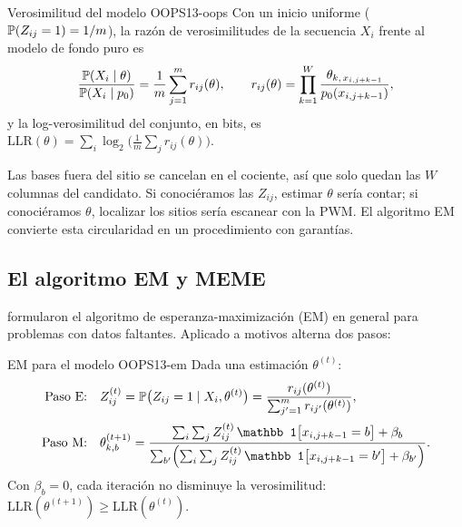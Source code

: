 \begin{definicion}{Verosimilitud del modelo OOPS}{13-oops}
Con un inicio uniforme ($\mathbb{P}(Z_{ij}=1)=1/m$), la razón de verosimilitudes de la secuencia $X_i$ frente al modelo de fondo puro es
\begin{equation}\label{eq:13-oops}
\frac{\mathbb{P}(X_i\mid\theta)}{\mathbb{P}(X_i\mid p_0)} = \frac{1}{m}\sum_{j=1}^{m} r_{ij}(\theta),\qquad
r_{ij}(\theta)=\prod_{k=1}^{W}\frac{\theta_{k,\,x_{i,j+k-1}}}{p_0(x_{i,j+k-1})},
\end{equation}
y la log-verosimilitud del conjunto, en bits, es $\mathrm{LLR}(\theta)=\sum_i\log_2\bigl(\frac1m\sum_j r_{ij}(\theta)\bigr)$.
\end{definicion}

\begin{simbolos}
\end{simbolos}

Las bases fuera del sitio se cancelan en el cociente, así que solo quedan las $W$ columnas del candidato. Si conociéramos las $Z_{ij}$, estimar $\theta$ sería contar; si conociéramos $\theta$, localizar los sitios sería escanear con la PWM. El algoritmo EM convierte esta circularidad en un procedimiento con garantías.

\subsection{El algoritmo EM y MEME}

\textcite{c13-dempster1977} formularon el algoritmo de esperanza-maximización (EM) en general para problemas con datos faltantes. Aplicado a motivos alterna dos pasos:

\begin{teorema}{EM para el modelo OOPS}{13-em}
Dada una estimación $\theta^{(t)}$:
\begin{align}
\text{Paso E:}\quad & Z_{ij}^{(t)} = \Prob\bigl(Z_{ij}=1\mid X_i,\theta^{(t)}\bigr) = \frac{r_{ij}(\theta^{(t)})}{\sum_{j'=1}^{m} r_{ij'}(\theta^{(t)})},\label{eq:13-estep}\\[2pt]
\text{Paso M:}\quad & \theta^{(t+1)}_{k,b} = \frac{\sum_{i}\sum_{j} Z_{ij}^{(t)}\,\mathbb 1\bigl[x_{i,j+k-1}=b\bigr] + \beta_b}{\sum_{b'}\Bigl(\sum_{i}\sum_{j} Z_{ij}^{(t)}\,\mathbb 1\bigl[x_{i,j+k-1}=b'\bigr] + \beta_{b'}\Bigr)} .\label{eq:13-mstep}
\end{align}
Con $\beta_b=0$, cada iteración no disminuye la verosimilitud: $\mathrm{LLR}(\theta^{(t+1)})\ge\mathrm{LLR}(\theta^{(t)})$.
\end{teorema}

